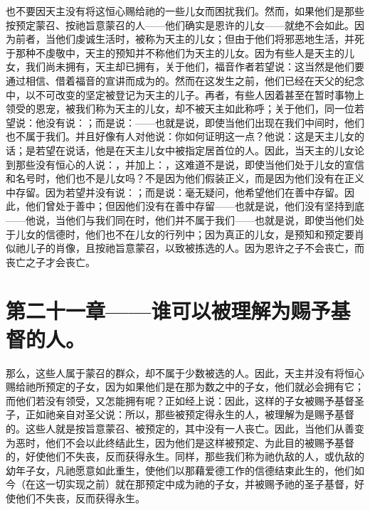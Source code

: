 也不要因天主没有将这恒心赐给祂的一些儿女而困扰我们。然而，如果他们是那些按预定蒙召、按祂旨意蒙召的人——他们确实是恩许的儿女——就绝不会如此。因为前者，当他们虔诚生活时，被称为天主的儿女；但由于他们将邪恶地生活，并死于那种不虔敬中，天主的预知并不称他们为天主的儿女。因为有些人是天主的儿女，我们尚未拥有，天主却已拥有，关于他们，福音作者若望说：这当然是他们要通过相信、借着福音的宣讲而成为的。然而在这发生之前，他们已经在天父的纪念中，以不可改变的坚定被登记为天主的儿子。再者，有些人因着甚至在暂时事物上领受的恩宠，被我们称为天主的儿女，却不被天主如此称呼；关于他们，同一位若望说：他没有说：；而是说：——也就是说，即使当他们出现在我们中间时，他们也不属于我们。并且好像有人对他说：你如何证明这一点？他说：这是天主儿女的话；是若望在说话，他是在天主儿女中被指定居首位的人。因此，当天主的儿女论到那些没有恒心的人说：，并加上：，这难道不是说，即使当他们处于儿女的宣信和名号时，他们也不是儿女吗？不是因为他们假装正义，而是因为他们没有在正义中存留。因为若望并没有说：；而是说：毫无疑问，他希望他们在善中存留。因此，他们曾处于善中；但因他们没有在善中存留——也就是说，他们没有坚持到底——他说，当他们与我们同在时，他们并不属于我们——也就是说，即使当他们处于儿女的信德时，他们也不在儿女的行列中；因为真正的儿女，是预知和预定要肖似祂儿子的肖像，且按祂旨意蒙召，以致被拣选的人。因为恩许之子不会丧亡，而丧亡之子才会丧亡。\par


\section{第二十一章——谁可以被理解为赐予基督的人。}

那么，这些人属于蒙召的群众，却不属于少数被选的人。因此，天主并没有将恒心赐给祂所预定的子女，因为如果他们是在那为数之中的子女，他们就必会拥有它；而他们若没有领受，又怎能拥有呢？正如经上说：因此，这样的子女被赐予基督圣子，正如祂亲自对圣父说：所以，那些被预定得永生的人，被理解为是赐予基督的。这些人就是按旨意蒙召、被预定的，其中没有一人丧亡。因此，当他们从善变为恶时，他们不会以此终结此生，因为他们是这样被预定、为此目的被赐予基督的，好使他们不失丧，反而获得永生。同样，那些我们称为祂仇敌的人，或仇敌的幼年子女，凡祂愿意如此重生，使他们以那藉爱德工作的信德结束此生的，他们如今（在这一切实现之前）就在那预定中成为祂的子女，并被赐予祂的圣子基督，好使他们不失丧，反而获得永生。\par

